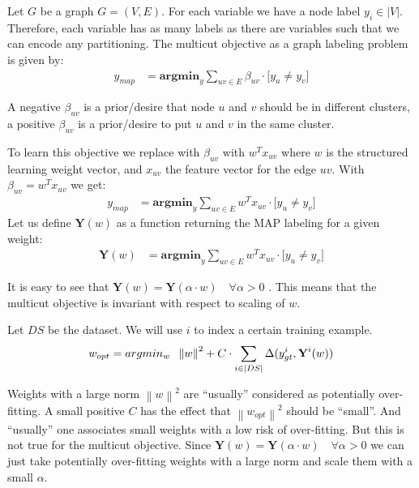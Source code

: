 \documentclass{article}
\newcommand{\norm}[1]{\left\lVert#1\right\rVert}
\begin{document}
Let $G$ be a graph $G = (V,E)$.
For each variable  we have a node label $y_i \in |V|$.
Therefore, each variable has as many labels as there are variables
such that we can encode any partitioning.
The multicut objective as a graph labeling problem is given by:
\begin{align*}
    y_{map} &=   
        \textbf{argmin}_{y} 
                \sum_{ uv \in E} 
                    \beta_{uv} \cdot \big[ y_u \neq y_v \big]
\end{align*}

A negative $\beta_{uv}$ is a prior/desire that node $u$ and $v$ should be
in different clusters, a positive $\beta_{uv}$ is a prior/desire to
put $u$ and $v$ in the same cluster.

To learn this objective we replace with $\beta_{uv}$
with $w^Tx_{uv}$ where $w$ is the structured learning weight 
vector, and $x_{uv}$ the feature vector for the edge $uv$.
With  $\beta_{uv} = w^Tx_{uv}$ we get:
\begin{align*}
    y_{map} &=   
        \textbf{argmin}_{y} 
                \sum_{ uv \in E} 
                    w^Tx_{uv} \cdot \big[ y_u \neq y_v \big] 
\end{align*}
Let us define $\textbf{Y}(w)$ as a function returning the MAP labeling for a given weight:
\begin{align*}
    \textbf{Y}(w) & =   
        \textbf{argmin}_{y} 
                \sum_{ uv \in E} 
                    w^Tx_{uv} \cdot \big[ y_u \neq y_v \big]
\end{align*}

It is easy to see that $\textbf{Y}(w) = \textbf{Y}( \alpha \cdot w) \quad\forall \alpha > 0$ . This means that
the multicut objective is invariant with respect to scaling of $w$.




Let $DS$ be the dataset.
We will use $i$ to index a certain training example.
\begin{align*}
    w_{opt} = 
        argmin_{w} 
        \hspace{0.2cm} \norm{w}^2 + 
        C \cdot 
        \sum_{i \in |DS|}  
        \Delta(y^i_{gt},\textbf{Y}^i(w))
\end{align*}

Weights with a large norm $\norm{w}^2$ are ``usually'' considered as potentially over-fitting.
A small positive $C$ has the effect that $\norm{w_{opt}}^2$ should be ``small''.
And  ``usually'' one associates small weights with a low risk of over-fitting.
But this is not true for the multicut objective.
Since $\textbf{Y}(w) = \textbf{Y}( \alpha \cdot w) \quad\forall \alpha > 0$ we
can just take potentially over-fitting weights with a large norm and scale them
with a small $\alpha$. 
\end{document}
